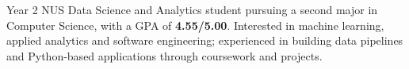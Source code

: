 Year 2 NUS Data Science and Analytics student pursuing a second major in Computer Science, with a GPA of \textbf{4.55/5.00}. Interested in machine learning, applied analytics and software engineering; experienced in building data pipelines and Python-based applications through coursework and projects.
